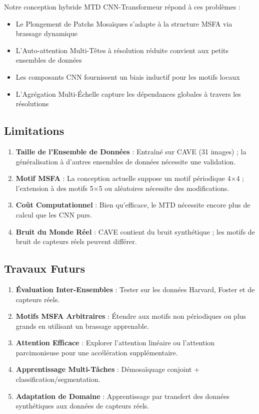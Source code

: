 \documentclass[conference]{IEEEtran}
\begin{document}
Notre conception hybride MTD CNN-Transformeur répond à ces problèmes :
\begin{itemize}
    \item Le Plongement de Patchs Mosaïques s'adapte à la structure MSFA via brassage dynamique
    \item L'Auto-attention Multi-Têtes à résolution réduite convient aux petits ensembles de données
    \item Les composants CNN fournissent un biais inductif pour les motifs locaux
    \item L'Agrégation Multi-Échelle capture les dépendances globales à travers les résolutions
\end{itemize}

\subsection{Limitations}

\begin{enumerate}
    \item \textbf{Taille de l'Ensemble de Données} : Entraîné sur CAVE (31 images) ; la généralisation à d'autres ensembles de données nécessite une validation.
    
    \item \textbf{Motif MSFA} : La conception actuelle suppose un motif périodique 4×4 ; l'extension à des motifs 5×5 ou aléatoires nécessite des modifications.
    
    \item \textbf{Coût Computationnel} : Bien qu'efficace, le MTD nécessite encore plus de calcul que les CNN purs.
    
    \item \textbf{Bruit du Monde Réel} : CAVE contient du bruit synthétique ; les motifs de bruit de capteurs réels peuvent différer.
\end{enumerate}

\subsection{Travaux Futurs}

\begin{enumerate}
    \item \textbf{Évaluation Inter-Ensembles} : Tester sur les données Harvard, Foster et de capteurs réels.
    
    \item \textbf{Motifs MSFA Arbitraires} : Étendre aux motifs non périodiques ou plus grands en utilisant un brassage apprenable.
    
    \item \textbf{Attention Efficace} : Explorer l'attention linéaire ou l'attention parcimonieuse pour une accélération supplémentaire.
    
    \item \textbf{Apprentissage Multi-Tâches} : Démosaïquage conjoint + classification/segmentation.
    
    \item \textbf{Adaptation de Domaine} : Apprentissage par transfert des données synthétiques aux données de capteurs réels.
\end{enumerate}
\end{document}
